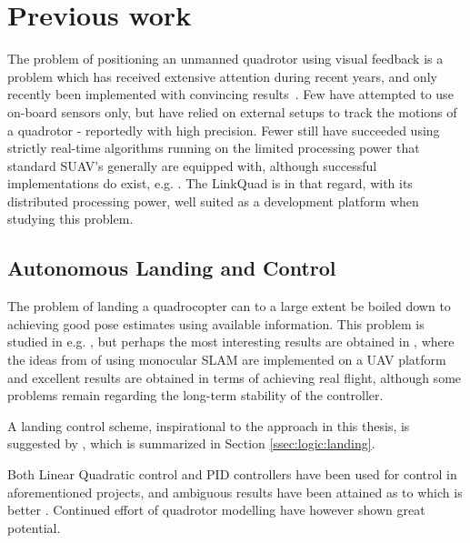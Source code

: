 \section{Previous work}
\label{sec:previouswork}

    The problem of positioning an unmanned quadrotor using
    visual feedback is a problem which has received extensive attention
    during recent years, and only recently been implemented with convincing
    results~\citep{DBLP:conf/icra/BloschWSS10,weiss11monocular}.
    Few have attempted to use on-board sensors only, but have relied on
    external setups to track the motions of a quadrotor - reportedly with high precision.
    Fewer still have succeeded using strictly real-time algorithms
    running on the limited processing power that standard
    SUAV's generally are equipped with, although successful implementations do exist, e.g. \citep{Rudol10}.
    The LinkQuad is in that regard, with its distributed processing power, well suited
    as a development platform when studying this problem.

    \subsection{Autonomous Landing and Control}
    The problem of landing a quadrocopter can to a large extent be boiled
    down to achieving good pose estimates using available information.
    This problem is studied in e.g. \citep{mellinger10perching,brockers:803111},
    but perhaps the most interesting results are obtained in \citep{DBLP:conf/icra/BloschWSS10,weiss11monocular},
    where the ideas from \citep{klein07parallel} of using monocular SLAM
    are implemented on a UAV platform and excellent results are obtained
    in terms of achieving real flight, although some problems remain regarding
    the long-term stability of the controller.

    A landing control scheme, inspirational to the approach in this thesis,
    is suggested by \citep{brockers:803111}, which is summarized in Section \ref{ssec:logic:landing}.

    Both Linear Quadratic control and PID controllers have been used for control
    in aforementioned projects, and ambiguous results have been attained
    as to which is better \citep{bouabdallah04pid}. Continued effort of
    quadrotor modelling have however shown great potential\citep{bouabdallah07full}.

